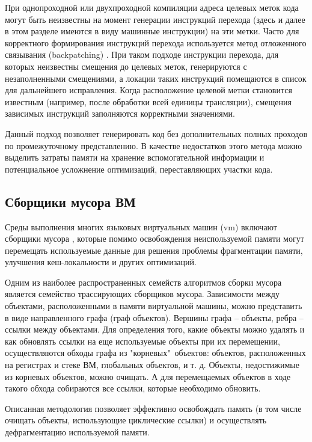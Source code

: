 При однопроходной или двухпроходной компиляции адреса целевых меток кода могут быть неизвестны на момент генерации инструкций перехода (здесь и далее в этом разделе имеются в виду машинные инструкции) на эти метки. Часто для корректного формирования инструкций перехода используется метод отложенного связывания (backpatching) \cite{dragon_book}. При таком подходе инструкции перехода, для которых неизвестны смещения до целевых меток, генерируются с незаполненными смещениями, а локации таких инструкций помещаются в список для дальнейшего исправления. Когда расположение целевой метки становится известным (например, после обработки всей единицы трансляции), смещения зависимых инструкций заполняются корректными значениями.

Данный подход позволяет генерировать код без дополнительных полных проходов по промежуточному представлению. В качестве недостатков этого метода можно выделить затраты памяти на хранение вспомогательной информации и потенциальное усложнение оптимизаций, переставляющих участки кода.

\subsection{Сборщики мусора ВМ}

Среды выполнения многих языковых виртуальных машин (\gls{vm}) включают сборщики мусора \cite{smith_nair_virtual_machines,garbage_collection_handbook}, которые помимо освобождения неиспользуемой памяти могут перемещать используемые данные для решения проблемы фрагментации памяти, улучшения кеш-локальности и других оптимизаций.

Одним из наиболее распространенных семейств алгоритмов сборки мусора является семейство трассирующих сборщиков мусора. Зависимости между объектами, расположенными в памяти виртуальной машины, можно представить в виде направленного графа (граф объектов). Вершины графа -- объекты, ребра -- ссылки между объектами. Для определения того, какие объекты можно удалять и как обновлять ссылки на еще используемые объекты при их перемещении, осуществляются обходы графа из "корневых"\, объектов: объектов, расположенных на регистрах и стеке ВМ, глобальных объектов, и т. д. Объекты, недостижимые из корневых объектов, можно очищать. А для перемещаемых объектов в ходе такого обхода собираются все ссылки, которые необходимо обновить.

Описанная методология позволяет эффективно освобождать память (в том числе очищать объекты, использующие циклические ссылки) и осуществлять дефрагментацию используемой памяти.

